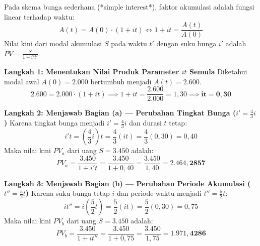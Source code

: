 \documentclass[11pt,a4paper]{article}
\begin{document}
\begin{solusibox}[1]
\begin{konsepbox}
Pada skema bunga sederhana (*simple interest*), faktor akumulasi adalah fungsi linear terhadap waktu:
$$A(t) = A(0) \cdot (1 + it) \iff 1 + it = \frac{A(t)}{A(0)}$$
Nilai kini dari modal akumulasi $S$ pada waktu $t'$ dengan suku bunga $i'$ adalah $PV = \frac{S}{1 + i't'}$.
\end{konsepbox}

\textbf{Langkah 1: Menentukan Nilai Produk Parameter $it$ Semula}  
Diketahui modal awal $A(0) = 2.000$ bertumbuh menjadi $A(t) = 2.600$.
$$2.600 = 2.000 \cdot (1 + it) \implies 1 + it = \frac{2.600}{2.000} = 1{,}30 \implies \mathbf{it = 0{,}30}$$

\textbf{Langkah 2: Menjawab Bagian (a) --- Perubahan Tingkat Bunga ($i' = \frac{4}{3}i$)}  
Karena tingkat bunga menjadi $i' = \frac{4}{3}i$ dan durasi $t$ tetap:
$$i't = \left(\frac{4}{3}i\right) t = \frac{4}{3}(it) = \frac{4}{3}(0{,}30) = 0{,}40$$
Maka nilai kini $PV_a$ dari uang $S = 3.450$ adalah:
$$PV_a = \frac{3.450}{1 + i't} = \frac{3.450}{1 + 0{,}40} = \frac{3.450}{1{,}40} = \mathbf{2.464{,}2857}$$

\textbf{Langkah 3: Menjawab Bagian (b) --- Perubahan Periode Akumulasi ($t'' = \frac{5}{2}t$)}  
Karena suku bunga tetap $i$ dan periode waktu menjadi $t'' = \frac{5}{2}t$:
$$it'' = i \left(\frac{5}{2}t\right) = \frac{5}{2}(it) = \frac{5}{2}(0{,}30) = 0{,}75$$
Maka nilai kini $PV_b$ dari uang $S = 3.450$ adalah:
$$PV_b = \frac{3.450}{1 + it''} = \frac{3.450}{1 + 0{,}75} = \frac{3.450}{1{,}75} = \mathbf{1.971{,}4286}$$
\end{solusibox}
\end{document}
